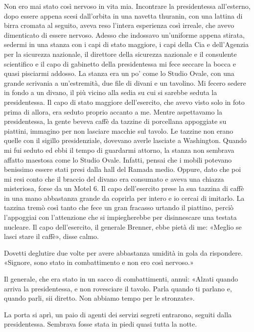 Non ero mai stato così nervoso in vita mia. Incontrare la presidentessa
all'esterno, dopo essere appena scesi dall'orbita in una navetta
thuranin, con una lattina di birra cromata al seguito, aveva reso
l'intera esperienza così irreale, che avevo dimenticato di essere
nervoso. Adesso che indossavo un'uniforme appena stirata, sedermi in una
stanza con i capi di stato maggiore, i capi della Cia e dell'Agenzia per
la sicurezza nazionale, il direttore della sicurezza nazionale e il
consulente scientifico e il capo di gabinetto della presidentessa mi
fece seccare la bocca e quasi pisciarmi addosso. La stanza era un po'
come lo Studio Ovale, con una grande scrivania a un'estremità, due file
di divani e un tavolino. Mi fecero sedere in fondo a un divano, il più
vicino alla sedia su cui si sarebbe seduta la presidentessa. Il capo di
stato maggiore dell'esercito, che avevo visto solo in foto prima di
allora, era seduto proprio accanto a me. Mentre aspettavamo la
presidentessa, la gente beveva caffè da tazzine di porcellana appoggiate
su piattini, immagino per non lasciare macchie sul tavolo. Le tazzine
non erano quelle con il sigillo presidenziale, dovevano averle lasciate
a Washington. Quando mi fui seduto ed ebbi il tempo di guardarmi
attorno, la stanza non sembrava affatto maestosa come lo Studio Ovale.
Infatti, pensai che i mobili potevano benissimo essere stati presi dalla
hall del Ramada medio. Oppure, dato che poi mi resi conto che il braccio
del divano era consumato e aveva una chiazza misteriosa, forse da un
Motel 6. Il capo dell'esercito prese la sua tazzina di caffè in una mano
abbastanza grande da coprirla per intero e io cercai di imitarlo. La
tazzina tremò così tanto che fece un gran fracasso urtando il piattino,
perciò l'appoggiai con l'attenzione che si impiegherebbe per
disinnescare una testata nucleare. Il capo dell'esercito, il generale
Brenner, ebbe pietà di me: «Meglio se lasci stare il caffè», disse
calmo.

Dovetti deglutire due volte per avere abbastanza umidità in gola da
rispondere. «Signore, sono stato in combattimento e non ero così
nervoso.»

Il generale, che era stato in un sacco di combattimenti, annuì: «Alzati
quando arriva la presidentessa, e non rovesciare il tavolo. Parla quando
ti parlano e, quando parli, sii diretto. Non abbiamo tempo per le
stronzate».

\hfill\break

La porta si aprì, un paio di agenti dei servizi segreti entrarono,
seguiti dalla presidentessa. Sembrava fosse stata in piedi quasi tutta
la notte.

